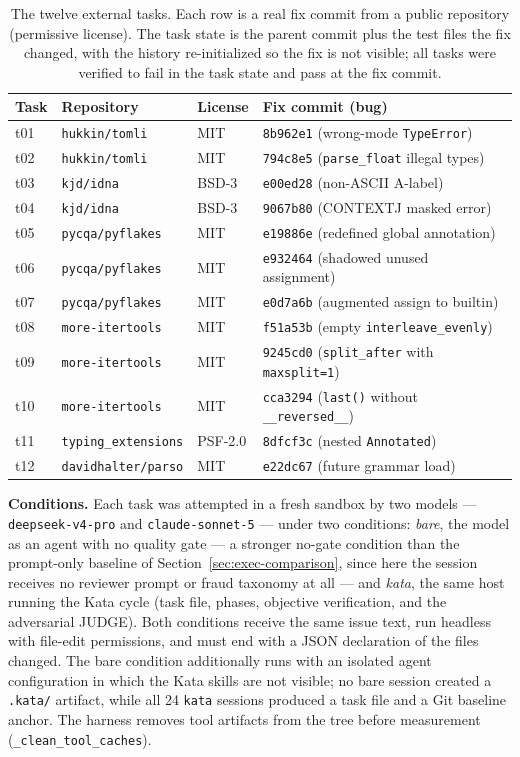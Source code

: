 \documentclass{sbc2019}%
\begin{document}
\begin{table}[!ht]
\caption{The twelve external tasks. Each row is a real fix commit from a
public repository (permissive license). The task state is the parent
commit plus the test files the fix changed, with the history
re-initialized so the fix is not visible; all tasks were verified to fail
in the task state and pass at the fix commit.}
\centering
\begin{tabular}{@{}llll@{}}
\hline\hline
Task & Repository & License & Fix commit (bug) \\
\hline
t01 & \texttt{hukkin/tomli} & MIT & \texttt{8b962e1} (wrong-mode \texttt{TypeError}) \\
t02 & \texttt{hukkin/tomli} & MIT & \texttt{794c8e5} (\texttt{parse\_float} illegal types) \\
t03 & \texttt{kjd/idna} & BSD-3 & \texttt{e00ed28} (non-ASCII A-label) \\
t04 & \texttt{kjd/idna} & BSD-3 & \texttt{9067b80} (CONTEXTJ masked error) \\
t05 & \texttt{pycqa/pyflakes} & MIT & \texttt{e19886e} (redefined global annotation) \\
t06 & \texttt{pycqa/pyflakes} & MIT & \texttt{e932464} (shadowed unused assignment) \\
t07 & \texttt{pycqa/pyflakes} & MIT & \texttt{e0d7a6b} (augmented assign to builtin) \\
t08 & \texttt{more-itertools} & MIT & \texttt{f51a53b} (empty \texttt{interleave\_evenly}) \\
t09 & \texttt{more-itertools} & MIT & \texttt{9245cd0} (\texttt{split\_after} with \texttt{maxsplit=1}) \\
t10 & \texttt{more-itertools} & MIT & \texttt{cca3294} (\texttt{last()} without \texttt{\_\_reversed\_\_}) \\
t11 & \texttt{typing\_extensions} & PSF-2.0 & \texttt{8dfcf3c} (nested \texttt{Annotated}) \\
t12 & \texttt{davidhalter/parso} & MIT & \texttt{e22dc67} (future grammar load) \\
\hline\hline
\end{tabular}
\label{tab:external-tasks}
\end{table}

\textbf{Conditions.} Each task was attempted in a fresh sandbox by two
models --- \texttt{deepseek-v4-pro} and \texttt{claude-sonnet-5} --- under
two conditions: \emph{bare}, the model as an agent with no quality gate ---
a stronger no-gate condition than the prompt-only baseline of
Section~\ref{sec:exec-comparison}, since here the session receives no
reviewer prompt or fraud taxonomy at all --- and \emph{kata}, the same host
running the Kata cycle (task file, phases,
objective verification, and the adversarial JUDGE). Both conditions
receive the same issue text, run headless with file-edit permissions, and
must end with a JSON declaration of the files changed. The bare condition
additionally runs with an isolated agent configuration in which the Kata
skills are not visible; no bare session created a \texttt{.kata/} artifact,
while all 24 \texttt{kata} sessions produced a task file and a Git baseline
anchor. The harness removes tool artifacts from the tree before measurement
(\texttt{\_clean\_tool\_caches}).
\end{document}
